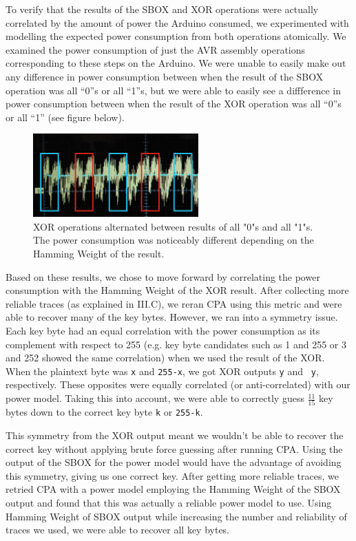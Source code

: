 \documentclass[journal]{ieee_style}
\begin{document}
To verify that the results of the SBOX and XOR operations were actually correlated by the amount of power the Arduino consumed, we experimented with modelling the expected power consumption from both operations atomically. We examined the power consumption of just the AVR assembly operations corresponding to these steps on the Arduino. We were unable to easily make out any difference in power consumption between when the result of the SBOX operation was all ``0''s or all ``1''s, but we were able to easily see a diffference in power consumption between when the result of the XOR operation was all ``0''s or all ``1'' (see figure below).

\begin{figure}[!t]
\centering
\includegraphics[width=2.5in]{XOR_PC}
\caption{XOR operations alternated between results of all "0"s and all "1"s. The power consumption was noticeably different depending on the Hamming Weight of the result.}
\label{fig_sim}
\end{figure}

Based on these results, we chose to move forward by correlating the power consumption with the Hamming Weight of the XOR result. After collecting more reliable traces (as explained in III.C), we reran CPA using this metric and were able to recover many of the key bytes. However, we ran into a symmetry issue. Each key byte had an equal correlation with the power consumption as its complement with respect to 255 (e.g. key byte candidates such as 1 and 255 or 3 and 252 showed the same correlation) when we used the result of the XOR. When the plaintext byte was \texttt{x} and \texttt{255-x}, we got XOR outputs \texttt{y} and  \texttt{~y}, respectively. These opposites were equally correlated (or anti-correlated) with our power model. Taking this into account, we were able to correctly guess $\frac{11}{15}$ key bytes down to the correct key byte \texttt{k} or \texttt{255-k}. 

This symmetry from the XOR output meant we wouldn't be able to recover the correct key without applying brute force guessing after running CPA. Using the output of the SBOX for the power model would have the advantage of avoiding this symmetry, giving us one correct key. After getting more reliable traces, we retried CPA with a power model employing the Hamming Weight of the SBOX output and found that this was actually a reliable power model to use. Using Hamming Weight of SBOX output while increasing the number and reliability of traces we used, we were able to recover all key bytes.
\end{document}
